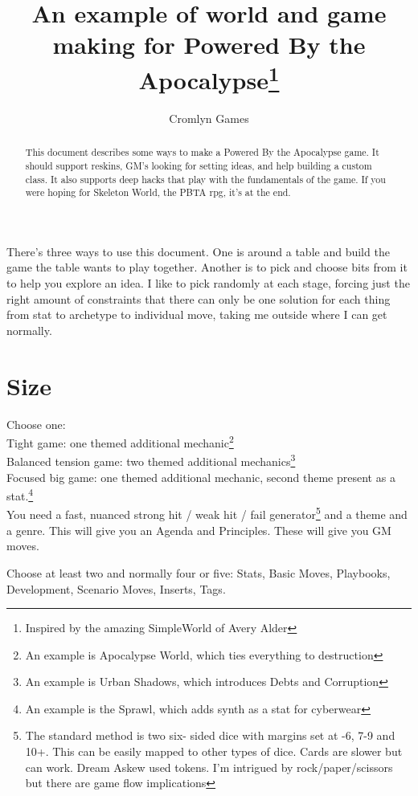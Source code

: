\documentclass{tufte-handout}
\title{An example of world and game making for Powered By the Apocalypse\thanks{Inspired by the amazing SimpleWorld of Avery Alder}}
\author[Cromlyn Games]{Cromlyn Games}
\begin{document}
\maketitle%

\begin{abstract}
\noindent
This document describes some ways to make  a Powered By the Apocalypse game.
It should support reskins, GM's looking for setting ideas, and help building a custom class.
It also supports deep hacks that play with the fundamentals of the game.
If you were hoping for Skeleton World, the PBTA rpg, it's at the end.
\end{abstract}

There's three ways to use this document. One is around a table and build the game the table wants to play together. Another is to pick and choose bits from it to help you explore an idea. I like to pick randomly at each stage, forcing just the right amount of constraints that there can only be one solution for each thing from stat to archetype to individual move, taking me outside where I can get normally.

\section{Size}
Choose one:\\
Tight game: one themed additional mechanic\footnote{An example is Apocalypse World, which ties everything to destruction} \\
Balanced tension game: two themed additional mechanics\footnote{An example is Urban Shadows, which introduces Debts and Corruption}\\
Focused big game: one themed additional mechanic, second theme present as a stat.\footnote{An example is the Sprawl, which adds synth as a stat for cyberwear}\\


You need a fast, nuanced strong hit / weak hit / fail generator\footnote{The standard method is two six- sided dice with margins set at -6, 7-9 and 10+. This can be easily mapped to other types of dice. Cards are slower but can work. Dream Askew used tokens. I'm intrigued by rock/paper/scissors but there are game flow implications}
 and a theme and a genre. This will give you an Agenda and Principles. These will give you GM moves. 

Choose at least two and normally four or five:
Stats, Basic Moves, Playbooks, Development, Scenario Moves, Inserts, Tags.
\end{document}
